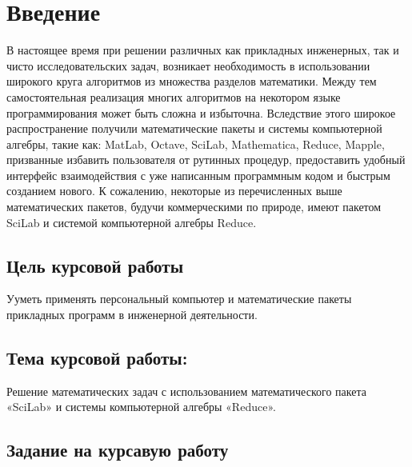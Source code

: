 \documentclass[russian,utf8,nocolumnxxxi,nocolumnxxxii]{eskdtext}
\begin{document}
\maketitle

\newpage

\tableofcontents

\newpage
\section{Введение}

В настоящее время при решении различных как прикладных инженерных, так и чисто исследовательских задач, возникает необходимость в использовании широкого круга алгоритмов из множества разделов математики. Между тем самостоятельная реализация многих алгоритмов на некотором языке программирования может быть сложна и избыточна. Вследствие этого широкое распространение получили математические пакеты и системы компьютерной алгебры, такие как: MatLab, Octave, SciLab, Mathematica, Reduce, Mapple, призванные избавить пользователя от рутинных процедур, предоставить удобный интерфейс взаимодействия с уже написанным программным кодом и быстрым созданием нового. К сожалению, некоторые из перечисленных выше математических пакетов, будучи коммерческими по природе, имеют пакетом SciLab и системой компьютерной алгебры Reduce.

\newpage
 \subsection{Цель курсовой работы}
Ууметь применять персональный компьютер и математические пакеты прикладных программ в инженерной деятельности.
\subsection{Тема курсовой работы:}
Решение математических задач с использованием математического пакета «SciLab» и системы компьютерной алгебры «Reduce».

\subsection{Задание на курсавую работу}
\end{document}
